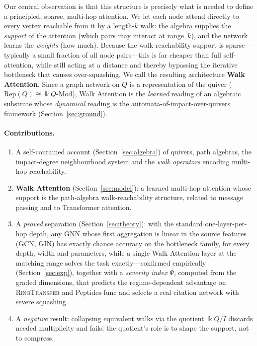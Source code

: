 \documentclass[runningheads]{llncs}
\newcommand{\kk}{\Bbbk}
\newcommand{\kQ}{\kk Q}
\begin{document}
Our central observation is that this structure is precisely what is needed to
define a principled, sparse, multi-hop attention. We let each node attend
directly to every vertex reachable from it by a length-$k$ walk: the algebra
supplies the \emph{support} of the attention (which pairs may interact at
range~$k$), and the network learns the \emph{weights} (how much). Because the
walk-reachability support is sparse---typically a small fraction of all node
pairs---this is far cheaper than full self-attention, while still acting at a
distance and thereby bypassing the iterative bottleneck that causes
over-squashing. We call the resulting architecture \textbf{Walk Attention}.
Since a graph network on $Q$ is a representation of the quiver
($\mathrm{Rep}(Q)\cong\kQ\text{-}\mathrm{Mod}$), Walk Attention is the
\emph{learned} reading of an algebraic substrate whose \emph{dynamical} reading
is the automata-of-impact-over-quivers framework \cite{zainea2026aiq}
(Section~\ref{sec:ground}).

\paragraph{Contributions.}
\begin{enumerate}
  \item A self-contained account (Section~\ref{sec:algebra}) of quivers, path
  algebras, the impact-degree neighbourhood system and the \emph{walk
  operators} encoding multi-hop reachability.
  \item \textbf{Walk Attention} (Section~\ref{sec:model}): a learned multi-hop
  attention whose support is the path-algebra walk-reachability structure,
  related to message passing and to Transformer attention.
  \item A \emph{proved} separation (Section~\ref{sec:theory}): with the
  standard one-layer-per-hop depth, any GNN whose first aggregation is linear
  in the source features (GCN, GIN) has exactly chance accuracy on the
  bottleneck family, for every depth, width and parameters, while a single Walk
  Attention layer at the matching range solves the task exactly---confirmed
  empirically (Section~\ref{sec:exp}), together with a \emph{severity index}
  $\Psi$, computed from the graded dimensions, that predicts the
  regime-dependent advantage on \textsc{RingTransfer} and Peptides-func and
  selects a real citation network with severe squashing.
  \item A \emph{negative} result: collapsing equivalent walks via the quotient
  $\kQ/I$ discards needed multiplicity and fails; the quotient's role is to
  shape the support, not to compress.
\end{enumerate}
\end{document}
